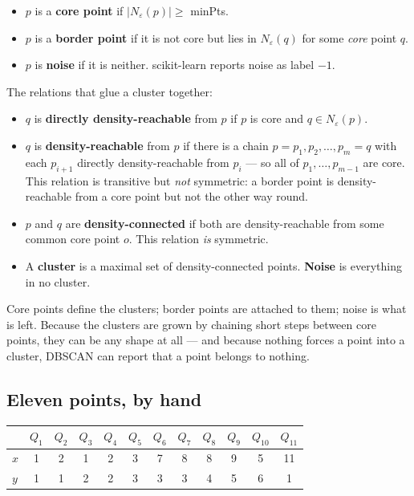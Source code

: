 \documentclass[11pt]{article}
\begin{document}
\begin{itemize}[leftmargin=*]
  \item $p$ is a \textbf{core point} if $|N_\varepsilon(p)| \ge$ minPts.
  \item $p$ is a \textbf{border point} if it is not core but lies in
    $N_\varepsilon(q)$ for some \emph{core} point $q$.
  \item $p$ is \textbf{noise} if it is neither. scikit-learn reports noise as
    label $-1$.
\end{itemize}

The relations that glue a cluster together:

\begin{itemize}[leftmargin=*]
  \item $q$ is \textbf{directly density-reachable} from $p$ if $p$ is core
    and $q \in N_\varepsilon(p)$.
  \item $q$ is \textbf{density-reachable} from $p$ if there is a chain
    $p = p_1, p_2, \ldots, p_m = q$ with each $p_{i+1}$ directly
    density-reachable from $p_i$ --- so all of $p_1, \ldots, p_{m-1}$ are
    core. This relation is transitive but \emph{not} symmetric: a border
    point is density-reachable from a core point but not the other way round.
  \item $p$ and $q$ are \textbf{density-connected} if both are
    density-reachable from some common core point $o$. This relation
    \emph{is} symmetric.
  \item A \textbf{cluster} is a maximal set of density-connected points.
    \textbf{Noise} is everything in no cluster.
\end{itemize}

\begin{keyidea}
Core points define the clusters; border points are attached to them; noise is
what is left. Because the clusters are grown by chaining short steps between
core points, they can be any shape at all --- and because nothing forces a
point into a cluster, DBSCAN can report that a point belongs to nothing.
\end{keyidea}

\subsection{Eleven points, by hand}

\begin{center}
\begin{tabular}{lccccccccccc}
  \toprule
  & $Q_1$ & $Q_2$ & $Q_3$ & $Q_4$ & $Q_5$ & $Q_6$ & $Q_7$ & $Q_8$ & $Q_9$
  & $Q_{10}$ & $Q_{11}$ \\
  \midrule
  $x$ & 1 & 2 & 1 & 2 & 3 & 7 & 8 & 8 & 9 & 5 & 11 \\
  $y$ & 1 & 1 & 2 & 2 & 3 & 3 & 3 & 4 & 5 & 6 & 1 \\
  \bottomrule
\end{tabular}
\end{center}
\end{document}
